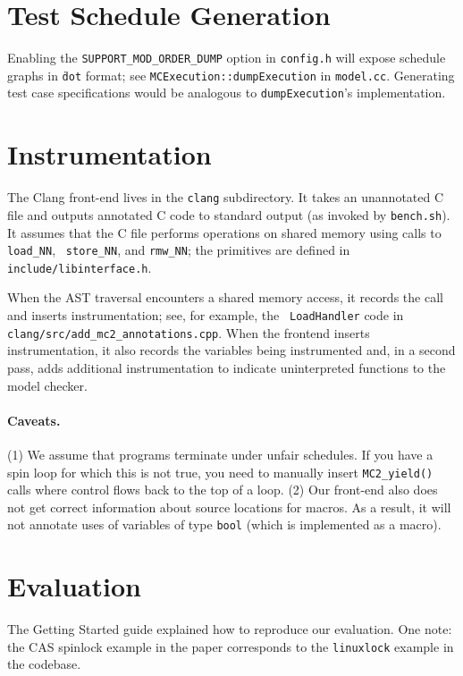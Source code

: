 \documentclass[10pt,nocopyrightspace,preprint]{sigplanconf}
\begin{document}
\section{Test Schedule Generation}
Enabling the {\tt SUPPORT\_MOD\_ORDER\_DUMP} option in {\tt config.h} will
expose schedule graphs in {\tt \.dot} format; see {\tt MCExecution::dumpExecution} 
in {\tt model.cc}. Generating test case specifications would be analogous to
{\tt dumpExecution}'s implementation.

\section{Instrumentation}
\label{sec:frontend}
The Clang front-end lives in the {\tt clang} subdirectory. It takes an
unannotated C file and outputs annotated C code to standard output (as
invoked by {\tt bench.sh}).  It assumes that the C file performs
operations on shared memory using calls to {\tt load\_NN}, {\tt
  store\_NN}, and {\tt rmw\_NN}; the primitives are defined in {\tt
  include/libinterface.h}.

When the AST traversal encounters a shared memory access, it records the
call and inserts instrumentation; see, for example, the {\tt
  LoadHandler} code in {\tt clang/src/add\_mc2\_annotations.cpp}. When
the frontend inserts instrumentation, it also records the variables
being instrumented and, in a second pass, adds additional
instrumentation to indicate uninterpreted functions to the model
checker.

\paragraph{Caveats.} (1) We assume that programs terminate under unfair schedules. 
If you have a spin loop for which this is not true, you need to
manually insert {\tt MC2\_yield()} calls where control flows back to
the top of a loop.  (2) Our front-end also does not get correct
information about source locations for macros.  As a result, it will
not annotate uses of variables of type {\tt bool} (which is
implemented as a macro).

\section{Evaluation}
The Getting Started guide explained how to reproduce our evaluation.
One note: the CAS spinlock example in the paper corresponds to the
{\tt linuxlock} example in the codebase.
\end{document}
